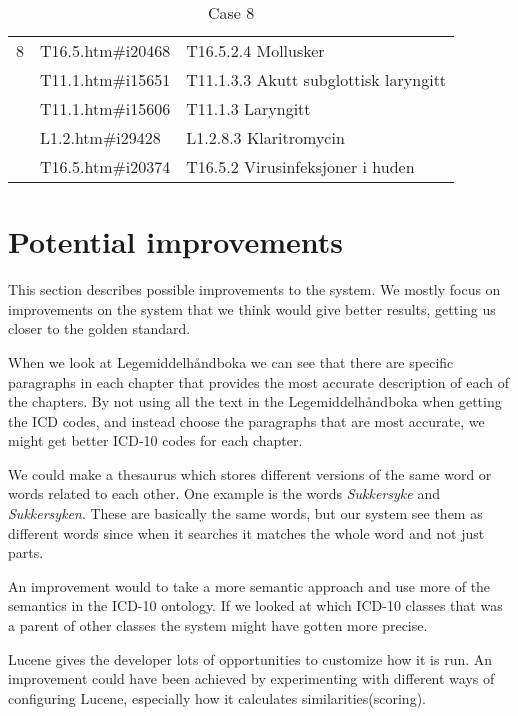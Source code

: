 \begin{table}[htbp]\center
\caption{Case 8}
\begin{tabular}{cll}
\toprule
8 & T16.5.htm\#i20468  & T16.5.2.4 Mollusker \\
  & T11.1.htm\#i15651  & T11.1.3.3 Akutt subglottisk laryngitt \\
  & T11.1.htm\#i15606  & T11.1.3 Laryngitt \\
  & L1.2.htm\#i29428   & L1.2.8.3 Klaritromycin \\
  & T16.5.htm\#i20374  & T16.5.2 Virusinfeksjoner i huden \\
\bottomrule
\end{tabular}
\end{table}


\section{Potential improvements}
\label{sec:potential-improvements}

This section describes possible improvements to the system. We mostly focus on
improvements on the system that we think would give better results, getting us
closer to the golden standard.

When we look at Legemiddelhåndboka we can see that there are specific paragraphs
in each chapter that provides the most accurate description of each of the
chapters. By not using all the text in the Legemiddelhåndboka when getting the
ICD codes, and instead choose the paragraphs that are most accurate, we might
get better ICD-10 codes for each chapter.

We could make a thesaurus which stores different versions of the same word or
words related to each other. One example is the words \emph{Sukkersyke} and
\emph{Sukkersyken}. These are basically the same words, but our system see them
as different words since when it searches it matches the whole word and not just
parts.

An improvement would to take a more semantic approach and use more of the
semantics in the ICD-10 ontology. If we looked at which ICD-10 classes that was
a parent of other classes the system might have gotten more precise.

Lucene gives the developer lots of opportunities to customize how it is run. An
improvement could have been achieved by experimenting with different ways of
configuring Lucene, especially how it calculates similarities(scoring).

